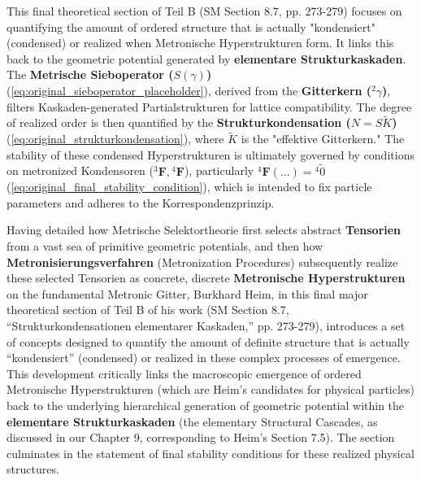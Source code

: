 \documentclass[12pt]{article}
\newcommand{\q}[1]{\enquote{#1}}
\newcommand{\metrischesieboperator}{S(\gamma)}
\newcommand{\metronisiertekondensor}[1]{{}^{#1}\mathbf{F}} %
\begin{document}
This final theoretical section of Teil B (SM Section 8.7, pp. 273-279) focuses on quantifying the amount of ordered structure that is actually "kondensiert" (condensed) or realized when Metronische Hyperstrukturen form. It links this back to the geometric potential generated by \textbf{elementare Strukturkaskaden}. The \textbf{Metrische Sieboperator (\(\metrischesieboperator\))} (\eqref{eq:original_sieboperator_placeholder}), derived from the \textbf{Gitterkern (\({}^2\gamma\))}, filters Kaskaden-generated Partialstrukturen for lattice compatibility. The degree of realized order is then quantified by the \textbf{Strukturkondensation (\(N = S\tilde{K}\))} (\eqref{eq:original_strukturkondensation}), where \(\tilde{K}\) is the "effektive Gitterkern." The stability of these condensed Hyperstrukturen is ultimately governed by conditions on metronized Kondensoren (\(\metronisiertekondensor{3}, \metronisiertekondensor{4}\)), particularly \( \metronisiertekondensor{4}(\dots) = {}^{4}\tilde{0} \) (\eqref{eq:original_final_stability_condition}), which is intended to fix particle parameters and adheres to the Korrespondenzprinzip.

Having detailed how Metrische Selektortheorie first selects abstract \textbf{Tensorien} from a vast sea of primitive geometric potentials, and then how \textbf{Metronisierungsverfahren} (Metronization Procedures) subsequently realize these selected Tensorien as concrete, discrete \textbf{Metronische Hyperstrukturen} on the fundamental Metronic Gitter, Burkhard Heim, in this final major theoretical section of Teil B of his work (SM Section 8.7, \q{Strukturkondensationen elementarer Kaskaden,} pp. 273-279), introduces a set of concepts designed to quantify the amount of definite structure that is actually \q{kondensiert} (condensed) or realized in these complex processes of emergence. This development critically links the macroscopic emergence of ordered Metronische Hyperstrukturen (which are Heim's candidates for physical particles) back to the underlying hierarchical generation of geometric potential within the \textbf{elementare Strukturkaskaden} (the elementary Structural Cascades, as discussed in our Chapter 9, corresponding to Heim's Section 7.5). The section culminates in the statement of final stability conditions for these realized physical structures.
\end{document}

